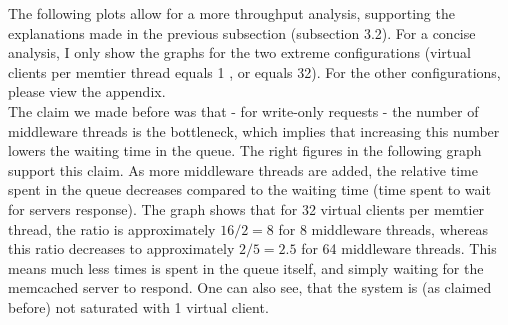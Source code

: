 \documentclass[11pt,a4paper]{article}
\begin{document}

The following plots allow for a more throughput analysis, supporting the explanations made in the previous subsection (subsection 3.2).
For a concise analysis, I only show the graphs for the two extreme configurations (virtual clients per memtier thread equals 1 , or equals 32).
For the other configurations, please view the appendix. \\
The claim we made before was that - for write-only requests - the number of middleware threads is the bottleneck, which implies that increasing this number lowers the waiting time in the queue.
The right figures in the following graph support this claim.
As more middleware threads are added, the relative time spent in the queue decreases compared to the waiting time (time spent to wait for servers response). 
The graph shows that for 32 virtual clients per memtier thread, the ratio is approximately $16 / 2 = 8$ for 8 middleware threads, whereas this ratio decreases to approximately $ 2 / 5 = 2.5 $ for 64 middleware threads.
This means much less times is spent in the queue itself, and simply waiting for the memcached server to respond.
One can also see, that the system is (as claimed before) not saturated with 1 virtual client.\\
\end{document}
